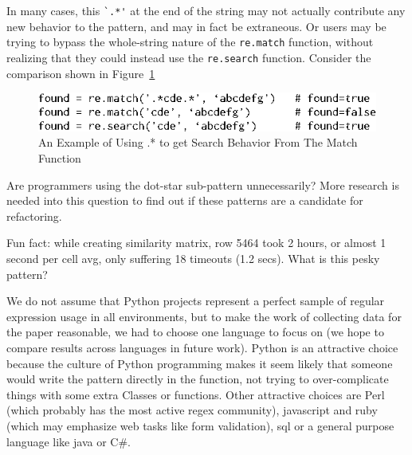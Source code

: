 In many cases, this \verb!`.*'! at the end of the string may not actually contribute any new behavior to the pattern, and may in fact be extraneous.  Or users may be trying to bypass the whole-string nature of the {\tt re.match} function, without realizing that they could instead use the {\tt re.search} function.  Consider the comparison shown in Figure~\ref{fig:searchVSmatch}

\begin{figure}[htb]
\centering
\includegraphics[width=\columnwidth]{../illustrations/matchVSsearch.eps}
\caption{An Example of Using .* to get Search Behavior From The Match Function}
\label{fig:searchVSmatch}
\end{figure}

Are programmers using the dot-star sub-pattern unnecessarily? More research is needed into this question to find out if these patterns are a candidate for refactoring.






Fun fact: while creating similarity matrix, row 5464 took 2 hours, or almost 1 second per cell avg, only suffering 18 timeouts (1.2 secs).  What is this pesky pattern?

We do not assume that Python projects represent a perfect sample of regular expression usage in all environments, but to make the work of collecting data for the paper reasonable, we had to choose one language to focus on (we hope to compare results across languages in future work).  Python is an attractive choice because the culture of Python programming makes it seem likely that someone would write the pattern directly in the function, not trying to over-complicate things with some extra Classes or functions.  Other attractive choices are Perl (which probably has the most active regex community), javascript and ruby (which may emphasize web tasks like form validation), sql or a general purpose language like java or C\#.








